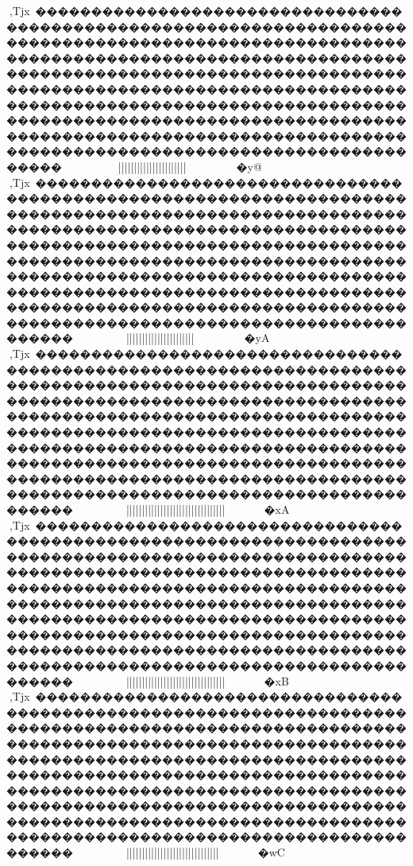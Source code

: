 {{{{{{{{{{{{{{{{{{{{{{{{{{{{{{{{{{{{{{{{{{{{{{{{{{{{{{{{{{{{{{{{{{{{{{{{{{{{{{{{{{{{{{{{{{{{{{{{{{{{{{{{{{{{{{{{{{{{{{{{{{{{{{{{{{{{{{{{{{{{{{{{{{{{{{{{{{{{{{{{{{{{{{{{{{{{{{{{{{{{{{{{{{{{{{{{{{{{{{{{{{{{{{{{{{{{{{{{{{{{{{{{{{{{{{{{{{{{{{{{{{{{{{{{{{{{{{{{{{{{{{{{{{{{{{{{{{{{{{{{{{{{{{{{{{{{{{{{{{{{{{{{{{{{{{{{{{{{{{{{{{{{{{{{{{{{{{{{{{{{{{{{{{{{{{{{{{{{{{{{{{{{{{{{{{{{{{{{{{{,Tjx~��������������������������������������������������������������������������������������������������������������������������������������������������������������������������������������������������������������������������������������������������������������������������������������������������������������������������������������������������������������������������~~~~~~~~~}}}}}||}||||{{{{{{{{{{{{{{{{{{{{||||{{{{{{{{||||{{{{{{{{||||}}}}||||}}}}~~}}}}}}}~~~~~~~�y@
,Tjx~���������������������������������������������������������������������������������������������������������������������������������������������������������������������������������������������������������������������������������������������������������������������������������������������������������������������������������������������������������������������������~~~~~~~~~}}}}}||}||||{{{{{{{{{{{{{{{{{{{{||||{{{{{{{{||||{{{{{{{{||||}}}}||||}}}}~~}}}}}}}~~~~~~~�yA
,Tjx~���������������������������������������������������������������������������������������������������������������������������������������������������������������������������������������������������������������������������������������������������������������������������������������������������������������������������������������������������������������������������~~~~~~~~~}}}}}||}||||{{{{{{{{{{{{{{{{{{{{{{{{||||||||{{{{||||||||||||}}}}||||}}}}}}}}||}}}~~~~~~~�xA
,Tjx~���������������������������������������������������������������������������������������������������������������������������������������������������������������������������������������������������������������������������������������������������������������������������������������������������������������������������������������������������������������������������~~~~~~~~~}}}}}||}||||{{{{{{{{{{{{{{{{{{{{{{{{||||||||{{{{||||||||||||}}}}||||}}}}}}}}||}}}~~~~~~~�xB
,Tjx~���������������������������������������������������������������������������������������������������������������������������������������������������������������������������������������������������������������������������������������������������������������������������������������������������������������������������������������������������������������������������~~~~~~~~~}}}}}||}||||{{{{{{{{{{{{{{{{{{{{{{{{||||||||{{{{||||||||||||}}}}||||}}}}}}}}}}}}}~~~~~~~�wC
}}}}}}}}}}}}}}}}}}}}}}}}}}}}}}}}}}}}}}}}}}}}}}}}}}}}}}}}}}}}}}}}}}}}}}}}}}}}}}}}}}}}}}}}}}}}}}}}}}}}}}}}}}}}}}}}}}}}}}}}}}}}}}}}}}}}}}}}}}}}}}}}}}}}}}}}}}}}}}}}}}}}}}}}}}}}}}}}}}}}}}}}}}}}}}}}}}}}}}}}}}}}}}}}}}}}}}}}}}}}}}}}}}}}}}}}}}}}}}}}}}}}}}}}}}}}}}}}}}}}}}}}}}}}}}}}}}}}}}}}}}}}}}}}}}}}}}}}}}}}}}}}}}}}}}}}}}}}}}}}}}}}}}}}}}}}}}}}}}}}}}}}}}}}}}}}}}}}}}}}}}}}}}}}}}}}}}}}}}}}}}}}}}}}}}}}}}}}}}}}}}}}}}}}}}}}}}}}}}}}}}}}}}}}
